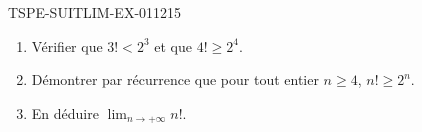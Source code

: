 \begin{exercice}{TSPE-SUITLIM-EX-011}{2}{15}
\begin{enumerate}
  \item Vérifier que $3! < 2^3$ et que $4! \geq 2^4$.
  \item Démontrer par récurrence que pour tout entier $n \geq 4$, $n! \geq 2^n$.
  \item En déduire $\lim_{n \to +\infty} n!$.
\end{enumerate}
\end{exercice}

